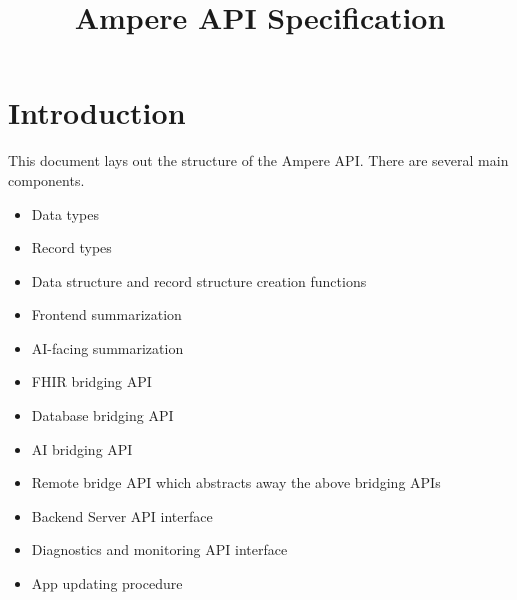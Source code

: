 \documentclass[12pt]{article}
\title{Ampere API Specification}
\begin{document}
\maketitle

\tableofcontents


\section{Introduction}
This document lays out the structure of the Ampere API. There are several main components.

\begin{itemize}
\item Data types
\item Record types
\item Data structure and record structure creation functions
\item Frontend summarization
\item AI-facing summarization
\item FHIR bridging API
\item Database bridging API
\item AI bridging API
\item Remote bridge API which abstracts away the above bridging APIs
\item Backend Server API interface
\item Diagnostics and monitoring API interface
\item App updating procedure
\end{itemize}
\end{document}
